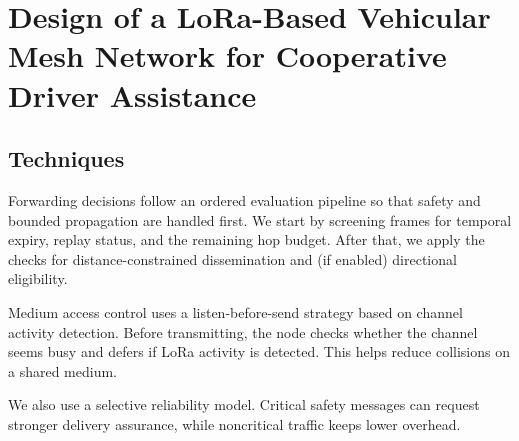 \chapter{Design of a LoRa-Based Vehicular Mesh Network for Cooperative Driver Assistance}







\section{Techniques}
Forwarding decisions follow an ordered evaluation pipeline so that safety and bounded propagation are handled
first. We start by screening frames for temporal expiry, replay status, and the remaining hop budget. After
that, we apply the checks for distance-constrained dissemination and (if enabled) directional eligibility.

Medium access control uses a listen-before-send strategy based on channel activity detection. Before
transmitting, the node checks whether the channel seems busy and defers if LoRa activity is detected. This
helps reduce collisions on a shared medium.

We also use a selective reliability model. Critical safety messages can request stronger delivery assurance,
while noncritical traffic keeps lower overhead.

